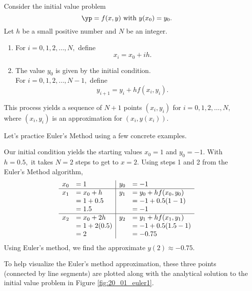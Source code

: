 
{Consider the initial value problem 
\[
\yp = f(x,y) \text{ with } y(x_0)=y_0.
\]
Let $h$ be a small positive number and $N$ be an integer.
\begin{enumerate}
\item For $i = 0, 1, 2, \ldots, N,$ define
\[x_i = x_0 + ih.\]
\item  The value $y_0$ is given by the initial condition.\\
For $i = 0, 1, 2, \ldots, N-1,$ define
\[y_{i+1} = y_i + hf(x_i,y_i).\]
\end{enumerate}
This process yields a sequence of $N+1$ points $(x_i,y_i)$ for $i= 0,1,2,\ldots,N$, where $(x_i, y_i)$ is an approximation for $(x_i,y(x_i))$.
}


Let's practice Euler's Method using a few concrete examples.\\

{Our initial condition yields the starting values $x_0 = 1$ and $y_0 = -1$.  With $h = 0.5,$ it takes $N=2$ steps to get to $x=2.$  Using steps 1 and 2 from the Euler's Method algorithm,
\[
\begin{array}{rl | rl}
x_0  &= 1			& 	y_0	&= -1\\ \hline
x_1 	&= x_0 + h 	& 	y_1 	&= y_0 + hf(x_0,y_0)\\
	&= 1 + 0.5	 	&		&= -1 + 0.5(1 - 1)\\
	&= 1.5		&		&= -1\\ \hline
x_2	&= x_0 + 2h	&	y_2	&= y_1 + hf(x_1,y_1)\\
	&= 1 + 2(0.5)	&		&= -1 + 0.5(1.5 -1)\\
	&= 2			&		&= -0.75
\end{array}
\]
Using Euler's method, we find the approximate $y(2) \approx -0.75.$

To help visualize the Euler's method approximation, these three points (connected by line segments) are plotted along with the analytical solution to the initial value problem in Figure \ref{fig:20_01_euler1}.
}\\

